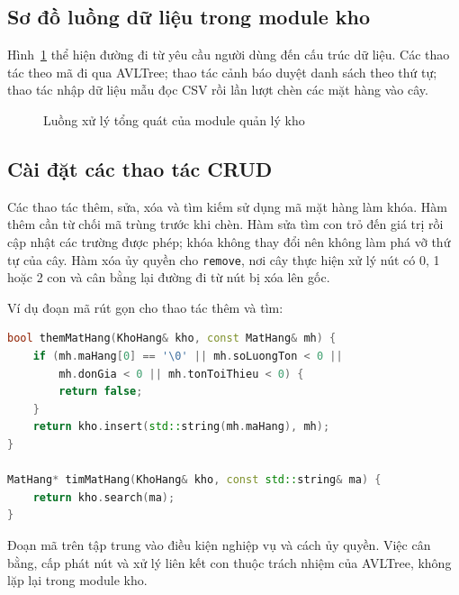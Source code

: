 \subsection{Sơ đồ luồng dữ liệu trong module kho}
Hình~\ref{fig:luong_kho} thể hiện đường đi từ yêu cầu người dùng đến cấu trúc dữ liệu. Các thao tác theo mã đi qua AVLTree; thao tác cảnh báo duyệt danh sách theo thứ tự; thao tác nhập dữ liệu mẫu đọc CSV rồi lần lượt chèn các mặt hàng vào cây.
\begin{figure}[H]
\centering
{}
\caption{Luồng xử lý tổng quát của module quản lý kho}
\label{fig:luong_kho}
\end{figure}

\subsection{Cài đặt các thao tác CRUD}
Các thao tác thêm, sửa, xóa và tìm kiếm sử dụng mã mặt hàng làm khóa. Hàm thêm cần từ chối mã trùng trước khi chèn. Hàm sửa tìm con trỏ đến giá trị rồi cập nhật các trường được phép; khóa không thay đổi nên không làm phá vỡ thứ tự của cây. Hàm xóa ủy quyền cho \texttt{remove}, nơi cây thực hiện xử lý nút có 0, 1 hoặc 2 con và cân bằng lại đường đi từ nút bị xóa lên gốc.

Ví dụ đoạn mã rút gọn cho thao tác thêm và tìm:
\begin{lstlisting}[language=C++,caption={Minh họa thao tác thêm và tìm theo mã}]
bool themMatHang(KhoHang& kho, const MatHang& mh) {
    if (mh.maHang[0] == '\0' || mh.soLuongTon < 0 ||
        mh.donGia < 0 || mh.tonToiThieu < 0) {
        return false;
    }
    return kho.insert(std::string(mh.maHang), mh);
}

MatHang* timMatHang(KhoHang& kho, const std::string& ma) {
    return kho.search(ma);
}
\end{lstlisting}
Đoạn mã trên tập trung vào điều kiện nghiệp vụ và cách ủy quyền. Việc cân bằng, cấp phát nút và xử lý liên kết con thuộc trách nhiệm của AVLTree, không lặp lại trong module kho.

